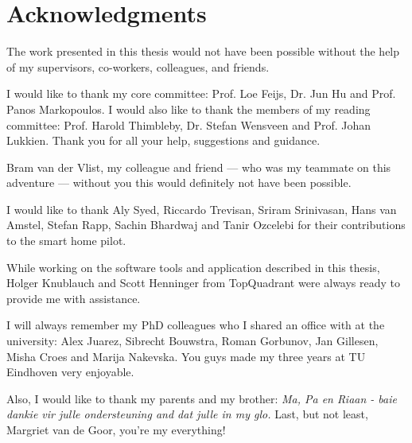 \cleardoublepage




\bigskip

\begingroup
\let\clearpage\relax
\let\cleardoublepage\relax
\let\cleardoublepage\relax
\chapter*{Acknowledgments}
The work presented in this thesis would not have been possible without the help of my supervisors, co-workers, colleagues, and friends.

I would like to thank my core committee: Prof. Loe Feijs, Dr. Jun Hu and Prof. Panos Markopoulos. I would also like to thank the members of my reading committee: Prof. Harold Thimbleby, Dr. Stefan Wensveen and Prof. Johan Lukkien. Thank you for all your help, suggestions and guidance.

Bram van der Vlist, my colleague and friend --- who was my teammate on this adventure --- without you this would definitely not have been possible.

I would like to thank Aly Syed, Riccardo Trevisan, Sriram Srinivasan, Hans van Amstel, Stefan Rapp, Sachin Bhardwaj and Tanir Ozcelebi for their contributions to the smart home pilot.

While working on the software tools and application described in this thesis, Holger Knublauch and Scott Henninger from TopQuadrant were always ready to provide me with assistance. 

I will always remember my PhD colleagues who I shared an office with at the university: Alex Juarez, Sibrecht Bouwstra, Roman Gorbunov, Jan Gillesen, Misha Croes and Marija Nakevska. You guys made my three years at TU Eindhoven very enjoyable.

Also, I would like to thank my parents and my brother: \emph{Ma, Pa en Riaan - baie dankie vir julle ondersteuning and dat julle in my glo.} Last, but not least, Margriet van de Goor, you're my everything!

\endgroup



